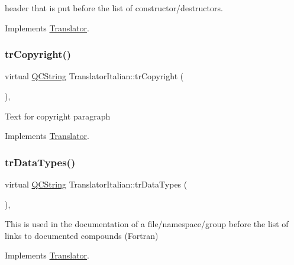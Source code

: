 header that is put before the list of constructor/destructors. 

Implements \mbox{\hyperlink{class_translator}{Translator}}.

\mbox{\label{class_translator_italian_ae256a7ad876bde0aef55eaaabcc6d794}} 
\subsubsection{\texorpdfstring{trCopyright()}{trCopyright()}}
{\footnotesize\ttfamily virtual \mbox{\hyperlink{class_q_c_string}{Q\+C\+String}} Translator\+Italian\+::tr\+Copyright (\begin{DoxyParamCaption}{ }\end{DoxyParamCaption})\hspace{0.3cm}{\ttfamily [inline]}, {\ttfamily [virtual]}}

Text for copyright paragraph 

Implements \mbox{\hyperlink{class_translator}{Translator}}.

\mbox{\label{class_translator_italian_a5b18929b238f5ef28d7e1f246ad02297}} 
\subsubsection{\texorpdfstring{trDataTypes()}{trDataTypes()}}
{\footnotesize\ttfamily virtual \mbox{\hyperlink{class_q_c_string}{Q\+C\+String}} Translator\+Italian\+::tr\+Data\+Types (\begin{DoxyParamCaption}{ }\end{DoxyParamCaption})\hspace{0.3cm}{\ttfamily [inline]}, {\ttfamily [virtual]}}

This is used in the documentation of a file/namespace/group before the list of links to documented compounds (Fortran) 

Implements \mbox{\hyperlink{class_translator}{Translator}}.

\mbox{\label{class_translator_italian_a3a7317cfeb2960b8a03d4be585e33eee}} 
